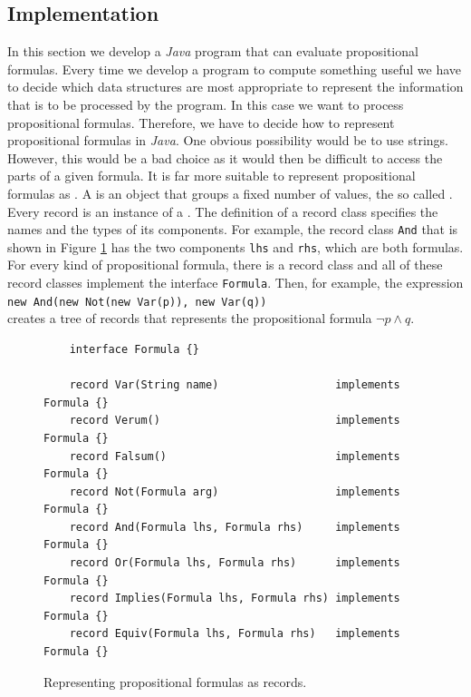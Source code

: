 \subsection{Implementation} 
In this section we develop a \textsl{Java} program that can evaluate propositional formulas.
Every time we develop a program to compute something useful we have to decide which data structures are
most appropriate to represent the information that is to be processed by the program.  In this case we want to
process propositional formulas.  Therefore, we have to decide how to represent propositional formulas in
\textsl{Java}.  One obvious possibility would be to use strings.  However, this would be a bad choice as it
would then be difficult to access the parts of a given formula.  It is far more suitable to represent
propositional formulas as .  A   is an object that groups a fixed
number of values, the so called .  Every record is an instance of a .  The
definition of a record class specifies the names and the types of its components.  For example, the record class
\texttt{And} that is shown in Figure \ref{fig:formula-records} has the two components \texttt{lhs} and
\texttt{rhs}, which are both formulas.  For every kind of propositional formula, there is a record class and all
of these record classes implement the interface \texttt{Formula}.  Then, for example, the expression
\\[0.2cm]
\hspace*{1.3cm}
\texttt{new And(new Not(new Var(p)), new Var(q))}
\\[0.2cm]
creates a tree of records that represents the propositional formula $\neg p \wedge q$.

\begin{figure}[!ht]
  \centering
\begin{verbatim}
    interface Formula {}

    record Var(String name)                  implements Formula {}
    record Verum()                           implements Formula {}
    record Falsum()                          implements Formula {}
    record Not(Formula arg)                  implements Formula {}
    record And(Formula lhs, Formula rhs)     implements Formula {}
    record Or(Formula lhs, Formula rhs)      implements Formula {}
    record Implies(Formula lhs, Formula rhs) implements Formula {}
    record Equiv(Formula lhs, Formula rhs)   implements Formula {}
\end{verbatim}
\vspace*{-0.3cm}
  \caption{Representing propositional formulas as records.}
  \label{fig:formula-records}
\end{figure} 

